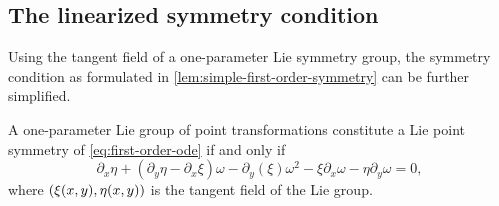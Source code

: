 \subsection{The linearized symmetry condition}

Using the tangent field of a one-parameter Lie symmetry group, the symmetry condition as formulated in \cref{lem:simple-first-order-symmetry} can be further simplified.
\begin{lem} \label{lem:linearized-first-order-symmetry}
  A one-parameter Lie group of point transformations constitute a Lie point symmetry of \cref{eq:first-order-ode} if and only if
  \begin{equation}
    \partial_x \eta + (\partial_y \eta - \partial_x \xi) \omega - \partial_y (\xi) \omega^2 -
    \xi \partial_x \omega - \eta \partial_y \omega = 0,
  \end{equation}
  where \(\pqty{\xi(x,y), \eta(x,y)}\) is the tangent field of the Lie group.
\end{lem}
